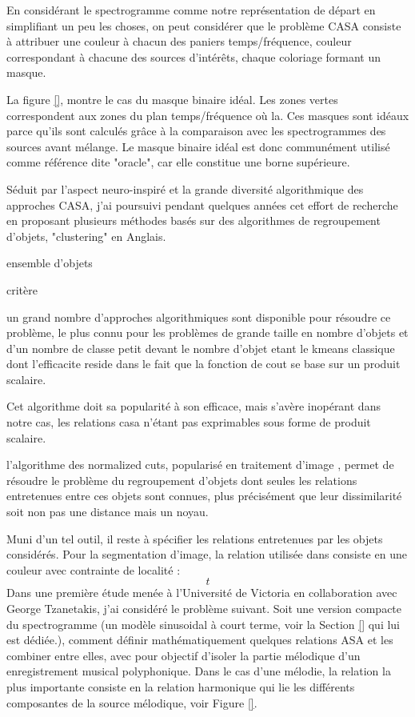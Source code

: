 En considérant le spectrogramme comme notre représentation de départ en simplifiant un peu les choses, on peut considérer que le problème CASA consiste à attribuer une couleur à chacun des paniers temps/fréquence, couleur correspondant à chacune des sources d'intérêts, chaque coloriage formant un masque.

La figure \ref{}, montre le cas du masque binaire idéal\cite{}. Les zones vertes correspondent aux zones du plan temps/fréquence où la. Ces masques sont idéaux parce qu'ils sont calculés grâce à la comparaison avec les spectrogrammes des sources avant mélange. Le masque binaire idéal est donc communément utilisé comme référence dite "oracle", car elle constitue une borne supérieure.

Séduit par l'aspect neuro-inspiré et la grande diversité algorithmique des approches CASA, j'ai  poursuivi pendant quelques années cet effort de recherche en proposant plusieurs méthodes basés sur des algorithmes de regroupement d'objets, "clustering" en Anglais.

ensemble d'objets

critère

un grand nombre d'approches algorithmiques sont disponible pour résoudre ce problème, le plus connu pour les problèmes de grande taille en nombre d'objets et d'un nombre de classe petit devant le nombre d'objet etant le kmeans classique dont l'efficacite reside dans le fait que la fonction de cout se base sur un produit scalaire.

Cet algorithme doit sa popularité à son efficace, mais s'avère inopérant dans notre cas, les relations casa n'étant pas exprimables sous forme de produit scalaire.

l'algorithme des normalized cuts, popularisé en traitement d'image \cite{shi-malik}, permet de résoudre le problème du regroupement d'objets dont seules les relations entretenues entre ces objets sont connues, plus précisément que leur dissimilarité soit non pas une distance mais un noyau.

Muni d'un tel outil, il reste à spécifier les relations entretenues par les objets considérés. Pour la segmentation d'image, la relation utilisée dans consiste en une couleur avec contrainte de localité :
\begin{equation}
t
\end{equation}
Dans une première étude menée à l'Université de Victoria en collaboration avec George Tzanetakis, j'ai considéré le problème suivant. Soit une version compacte du spectrogramme (un modèle sinusoidal à court terme, voir la Section \ref{} qui lui est dédiée.), comment définir mathématiquement quelques relations ASA et les combiner entre elles, avec pour objectif d'isoler la partie mélodique d'un enregistrement musical polyphonique. Dans le cas d'une mélodie, la relation la plus importante consiste en la relation harmonique qui lie les différents composantes de la source mélodique, voir Figure \ref{}.

